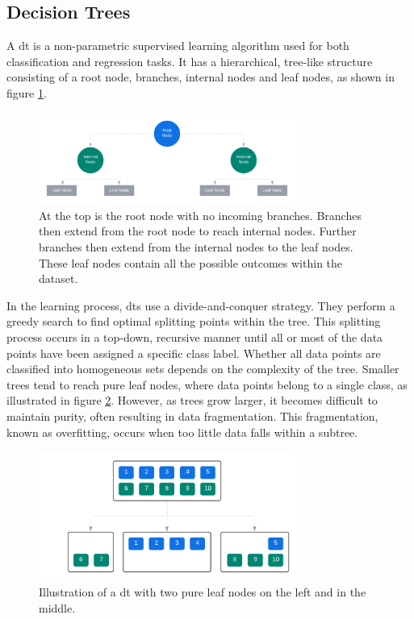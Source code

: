 \subsection{Decision Trees}
\label{sub:DT}

A \gls{dt} is a non-parametric supervised learning algorithm used for both classification and regression tasks. It has a hierarchical, tree-like structure consisting of a root node, branches, internal nodes and leaf nodes, as shown in figure \ref{fig:decision_tree}.

\begin{figure}[ht]
    \centering
    \includegraphics[width=0.75\textwidth]{./assets/img/decision_tree.png}
    \caption{At the top is the root node with no incoming branches. Branches then extend from the root node to reach internal nodes. Further branches then extend from the internal nodes to the leaf nodes. These leaf nodes contain all the possible outcomes within the dataset.}
    \label{fig:decision_tree}
\end{figure}

\noindent
In the learning process, \glspl{dt} use a divide-and-conquer strategy. They perform a greedy search to find optimal splitting points within the tree. This splitting process occurs in a top-down, recursive manner until all or most of the data points have been assigned a specific class label. Whether all data points are classified into homogeneous sets depends on the complexity of the tree. Smaller trees tend to reach pure leaf nodes, where data points belong to a single class, as illustrated in figure \ref{fig:pure_leaf_node}. However, as trees grow larger, it becomes difficult to maintain purity, often resulting in data fragmentation. This fragmentation, known as overfitting, occurs when too little data falls within a subtree.

\begin{figure}[ht]
    \centering
    \includegraphics[width=0.75\textwidth]{./assets/img/pure_leaf_node.png}
    \caption{Illustration of a \gls{dt} with two pure leaf nodes on the left and in the middle.}
    \label{fig:pure_leaf_node}
\end{figure}

